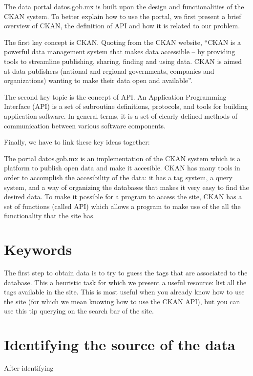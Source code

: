 \documentclass[]{book}
\begin{document}
The data portal datos.gob.mx is built upon the design and
functionalities of the CKAN system. To better explain how to use the
portal, we first present a brief overview of CKAN, the definition of API
and how it is related to our problem.

The first key concept is CKAN. Quoting from the CKAN website, ``CKAN is
a powerful data management system that makes data accessible -- by
providing tools to streamline publishing, sharing, finding and using
data. CKAN is aimed at data publishers (national and regional
governments, companies and organizations) wanting to make their data
open and available''.

The second key topic is the concept of API. An Application Programming
Interface (API) is a set of subroutine definitions, protocols, and tools
for building application software. In general terms, it is a set of
clearly defined methods of communication between various software
components.

Finally, we have to link these key ideas together:

The portal datos.gob.mx is an implementation of the CKAN system which is
a platform to publish open data and make it accesible. CKAN has many
tools in order to accomplish the accesibility of the data: it has a tag
system, a query system, and a way of organizing the databases that makes
it very easy to find the desired data. To make it possible for a program
to access the site, CKAN has a set of functions (called API) which
allows a program to make use of the all the functionality that the site
has.

\section{Keywords}\label{keywords}

The first step to obtain data is to try to guess the tags that are
associated to the database. This a heuristic task for which we present a
useful resource: list all the tags available in the site. This is most
useful when you already know how to use the site (for which we mean
knowing how to use the CKAN API), but you can use this tip querying on
the search bar of the site.

\section{Identifying the source of the
data}\label{identifying-the-source-of-the-data}

After identifying
\end{document}
